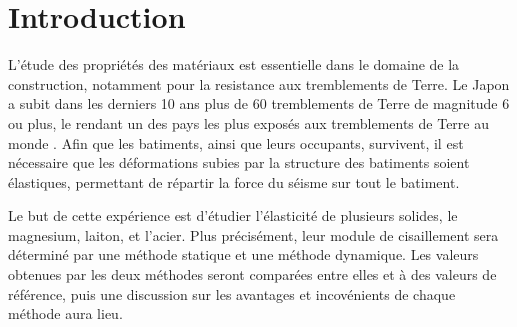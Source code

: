 \section{Introduction}

L'étude des propriétés des matériaux est essentielle dans le domaine de la construction, notamment pour la resistance aux tremblements de Terre. Le Japon a subit dans les derniers 10 ans plus de 60 tremblements de Terre de magnitude 6 ou plus, le rendant un des pays les plus exposés aux tremblements de Terre au monde \cite{japan_shakey}. Afin que les batiments, ainsi que leurs occupants, survivent, il est nécessaire que les déformations subies par la structure des batiments soient élastiques, permettant de répartir la force du séisme sur tout le batiment.

Le but de cette expérience est d'étudier l'élasticité de plusieurs solides, le magnesium, laiton, et l'acier. Plus précisément, leur module de cisaillement sera déterminé par une méthode statique et une méthode dynamique. Les valeurs obtenues par les deux méthodes seront comparées entre elles et à des valeurs de référence, puis une discussion sur les avantages et incovénients de chaque méthode aura lieu.